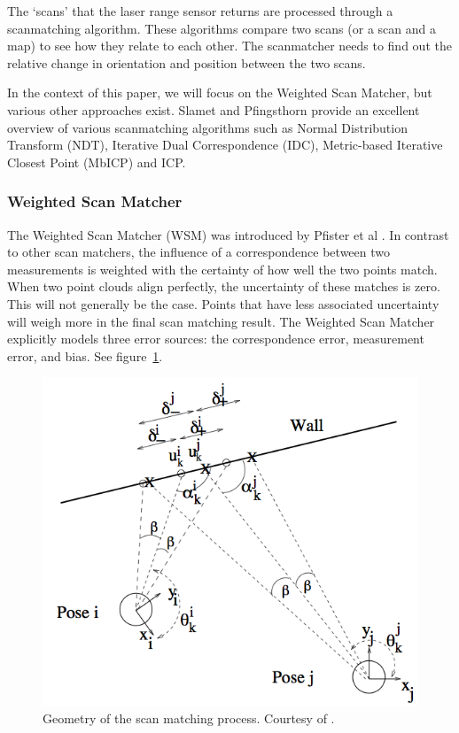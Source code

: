 The `scans' that the laser range sensor returns are processed through a scanmatching algorithm. These algorithms compare two scans (or a scan and a map) to see how they relate to each other. The scanmatcher needs to find out the relative change in orientation and position between the two scans.

In the context of this paper, we will focus on the Weighted Scan Matcher, but various other approaches exist. Slamet and Pfingsthorn\cite{ethembabaoglu2007active} provide an excellent overview of various scanmatching algorithms such as Normal Distribution Transform (NDT), Iterative Dual Correspondence (IDC), Metric-based Iterative Closest Point (MbICP) and ICP.

\subsubsection{Weighted Scan Matcher}
The Weighted Scan Matcher (WSM) was introduced by Pfister et al \cite{pfister2002weighted}. In contrast to other scan matchers, the influence of a correspondence between two measurements is weighted with the certainty of how well the two points match. When two point clouds align perfectly, the uncertainty of these matches is zero. This will not generally be the case. Points that have less associated uncertainty will weigh more in the final scan matching result. The Weighted Scan Matcher explicitly models three error sources: the correspondence error, measurement error, and bias. See figure~\ref{fig:pfister2002}. 

\begin{figure}[ht]
  \begin{center}
    \includegraphics[scale=0.3]{images/slam/pfister2002.png}
  \end{center}
  \caption{Geometry of the scan matching process. Courtesy of \cite{pfister2002weighted}.}
  \label{fig:pfister2002}
\end{figure}

